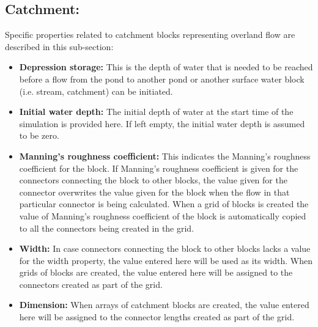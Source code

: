 \subsection{Catchment: }
Specific properties related to catchment blocks representing overland flow are described in this sub-section: 
\begin{itemize}
\item \textbf{Depression storage: } This is the depth of water that is needed to be reached before a flow from the pond to another pond or another surface water block (i.e. stream, catchment) can be initiated. 
\item \textbf{Initial water depth: } The initial depth of water at the start time of the simulation is provided here. If left empty, the initial water depth is assumed to be zero. 
\item \textbf{Manning's roughness coefficient: } This indicates the Manning's roughness coefficient for the block. If Manning's roughness coefficient is given for the connectors connecting the block to other blocks, the value given for the connector overwrites the value given for the block when the flow in that particular connector is being calculated. When a grid of blocks is created the value of Manning's roughness coefficient of the block is automatically copied to all the connectors being created in the grid.
\item \textbf{Width: } In case connectors connecting the block to other blocks lacks a value for the width property, the value entered here will be used as its width. When grids of blocks are created, the value entered here will be assigned to the connectors created as part of the grid. 
\item \textbf{Dimension: } When arrays of catchment blocks are created, the value entered here will be assigned to the connector lengths created as part of the grid.
\end{itemize}
